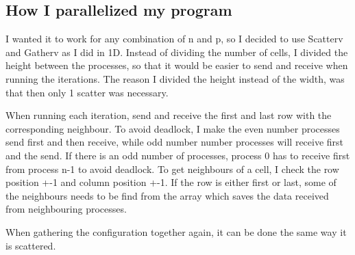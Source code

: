 \documentclass[a4paper]{extarticle}
\begin{document}
\subsection{How I parallelized my program}
I wanted it to work for any combination of n and p, so I decided to use Scatterv and Gatherv as I did in 1D. Instead of dividing the number of cells, I divided the height between the processes, so that it would be easier to send and receive when running the iterations. The reason I divided the height instead of the width, was that then only 1 scatter was necessary.

When running each iteration, send and receive the first and last row with the corresponding neighbour. To avoid deadlock, I make the even number processes send first and then receive, while odd number number processes will receive first and the send. If there is an odd number of processes, process 0 has to receive first from process n-1 to avoid deadlock.
To get neighbours of a cell, I check the row position +-1 and column position +-1. If the row is either first or last, some of the neighbours needs to be find from the array which saves the data received from neighbouring processes.

When gathering the configuration together again, it can be done the same way it is scattered.
\end{document}
